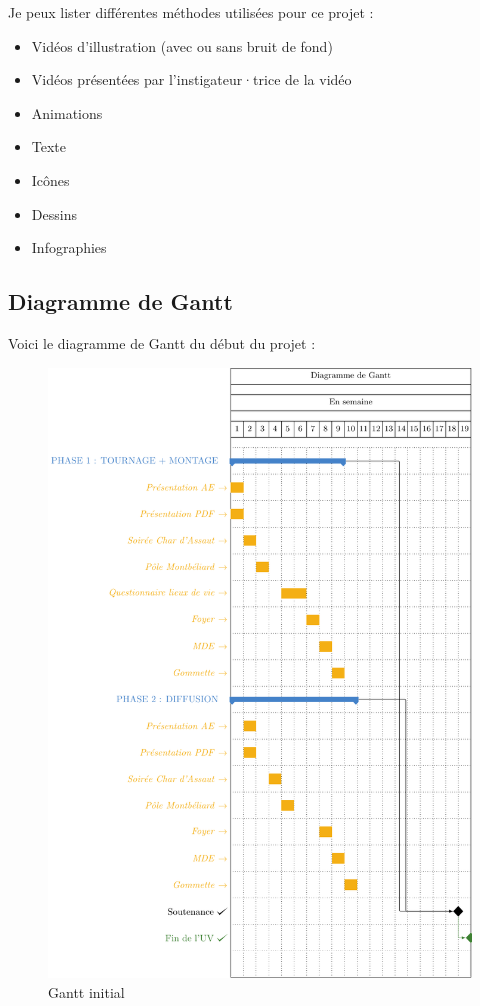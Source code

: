 Je peux lister différentes méthodes utilisées pour ce projet :
\begin{itemize}
    \item Vidéos d'illustration (avec ou sans bruit de fond)
    \item Vidéos présentées par l'instigateur·trice de la vidéo
    \item Animations
    \item Texte
    \item Icônes
    \item Dessins
    \item Infographies
\end{itemize}

\subsection{Diagramme de Gantt}\label{subsec:diagramme-de-gantt}

Voici le diagramme de Gantt du début du projet :

\begin{figure}[!h]
    \begin{center}
        \includegraphics[scale=0.6]{ressources/gantt}
        \caption{Gantt initial \label{fig:ganttIni}}
    \end{center}
\end{figure}

